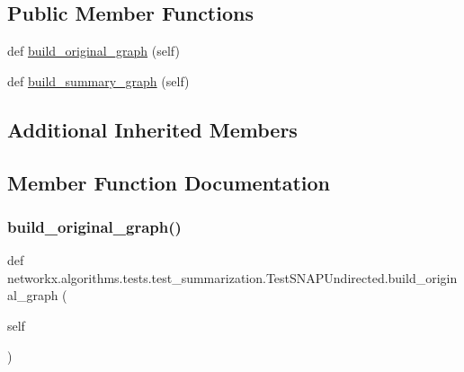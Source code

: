 \subsection*{Public Member Functions}
\begin{DoxyCompactItemize}
\item 
def \hyperlink{classnetworkx_1_1algorithms_1_1tests_1_1test__summarization_1_1TestSNAPUndirected_ab2edaa55d4e0294bbe7c4f4bc4ea40be}{build\+\_\+original\+\_\+graph} (self)
\item 
def \hyperlink{classnetworkx_1_1algorithms_1_1tests_1_1test__summarization_1_1TestSNAPUndirected_ac3adf4d0ab8e82be7ae7f48c6c2c69f7}{build\+\_\+summary\+\_\+graph} (self)
\end{DoxyCompactItemize}
\subsection*{Additional Inherited Members}


\subsection{Member Function Documentation}
\mbox{\label{classnetworkx_1_1algorithms_1_1tests_1_1test__summarization_1_1TestSNAPUndirected_ab2edaa55d4e0294bbe7c4f4bc4ea40be}} 
\subsubsection{\texorpdfstring{build\+\_\+original\+\_\+graph()}{build\_original\_graph()}}
{\footnotesize\ttfamily def networkx.\+algorithms.\+tests.\+test\+\_\+summarization.\+Test\+S\+N\+A\+P\+Undirected.\+build\+\_\+original\+\_\+graph (\begin{DoxyParamCaption}\item[{}]{self }\end{DoxyParamCaption})}

